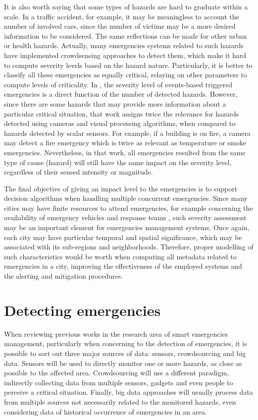 \begin{refsection}
It is also worth saying that some types of hazards are hard to graduate within a scale. In a traffic accident, for example, it may be meaningless to account the number of involved cars, since the number of victims may be a more desired information to be considered. The same reflections can be made for other urban or health hazards. Actually, many emergencies systems related to such hazards have implemented crowdsensing approaches to detect them, which make it hard to compute severity levels based on the hazard nature. Particularly, it is better to classify all these emergencies as equally critical, relaying on other parameters to compute levels of criticality. In \cite{emergenciesmetric3}, the severity level of events-based triggered emergencies is a direct function of the number of detected hazards. However, since there are some hazards that may provide more information about a particular critical situation, that work assigns twice the relevance for hazards detected using cameras and visual processing algorithms, when compared to hazards detected by scalar sensors. For example, if a building is on fire, a camera may detect a fire emergency which is twice as relevant as temperature or smoke emergencies. Nevertheless, in that work, all emergencies resulted from the same type of cause (hazard) will still have the same impact on the severity level, regardless of their sensed intensity or magnitude. 

The final objective of giving an impact level to the emergencies is to support decision algorithms when handling multiple concurrent emergencies. Since many cities may have finite resources to attend emergencies, for example concerning the availability of emergency vehicles and response teams \cite{costa2020automatic,tsunami1}, such severity assessment may be an important element for emergencies management systems. Once again, each city may have particular temporal and spatial significance, which may be associated with its sub-regions and neighborhoods. Therefore, proper modelling of such characteristics would be worth when computing all metadata related to emergencies in a city, improving the effectiveness of the employed systems and the alerting and mitigation procedures.

\section{Detecting emergencies}
\label{sec4}

When reviewing previous works in the research area of smart emergencies management, particularly when concerning to the detection of emergencies, it is possible to sort out three major sources of data: sensors, crowdsourcing and big data. Sensors will be used to directly monitor one or more hazards, as close as possible to the affected area. Crowdsourcing will use a different paradigm, indirectly collecting data from multiple sensors, gadgets and even people to perceive a critical situation. Finally, big data approaches will usually process data from multiple sources not necessarily related to the monitored hazards, even considering data of historical occurrence of emergencies in an area. 


\end{refsection}
